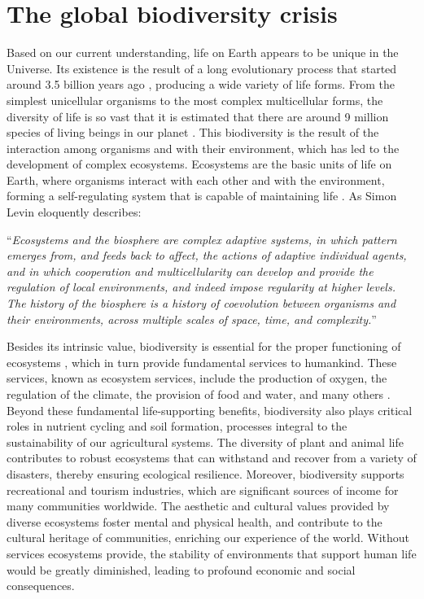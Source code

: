 \setcounter{page}{1}

\section{\label{sec:The global biodiversity crisis} The global biodiversity
  crisis}

Based on our current understanding, life on Earth appears to be unique in the
Universe. Its existence is the result of a long evolutionary process that
started around 3.5 billion years ago \cite{Taylor_1993,Schopf2006},
producing a wide variety of life forms. From the simplest unicellular organisms
to the most complex multicellular forms, the diversity of life is so vast that
it is estimated that there are around 9 million species of living beings in our
planet \cite{Cardinale2012}. This biodiversity is the result of the interaction
among organisms and with their environment, which has led to the development of
complex ecosystems. Ecosystems are the basic units of life on Earth, where
organisms interact with each other and with the environment, forming a
self-regulating system that is capable of maintaining life \cite{Levin2005}.
As Simon Levin eloquently describes:

\begin{displayquote}
  ``\textit{Ecosystems and the biosphere are complex adaptive systems, in which
    pattern
    emerges from, and feeds back to affect, the actions of adaptive individual
    agents, and in which cooperation and multicellularity can develop and
    provide
    the regulation of local environments, and indeed impose regularity at
    higher
    levels. The history of the biosphere is a history of coevolution between
    organisms and their environments, across multiple scales of space, time,
    and
    complexity.}''
\end{displayquote}

Besides its intrinsic value, biodiversity is essential for the proper
functioning of ecosystems \cite{Gamfeldt2008}, which in turn provide
fundamental services to humankind. These services, known as ecosystem services,
include the production of oxygen, the regulation of the climate, the provision
of food and water, and many others \cite{Daily1997}. Beyond these fundamental
life-supporting benefits, biodiversity also plays critical roles in nutrient
cycling and soil formation, processes integral to the sustainability of our
agricultural systems. The diversity of plant and animal life contributes to
robust ecosystems that can withstand and recover from a variety of disasters,
thereby ensuring ecological resilience. Moreover, biodiversity supports
recreational and tourism industries, which are significant sources of income
for many communities worldwide. The aesthetic and cultural values provided by
diverse ecosystems foster mental and physical health, and contribute to the
cultural heritage of communities, enriching our experience of the world.
Without services ecosystems provide, the stability of environments that support
human life would be greatly diminished, leading to profound economic and social
consequences.


